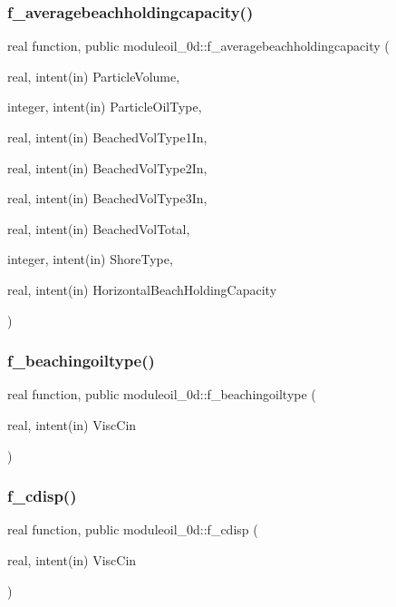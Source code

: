 \subsubsection{\texorpdfstring{f\+\_\+averagebeachholdingcapacity()}{f\_averagebeachholdingcapacity()}}
{\footnotesize\ttfamily real function, public moduleoil\+\_\+0d\+::f\+\_\+averagebeachholdingcapacity (\begin{DoxyParamCaption}\item[{real, intent(in)}]{Particle\+Volume,  }\item[{integer, intent(in)}]{Particle\+Oil\+Type,  }\item[{real, intent(in)}]{Beached\+Vol\+Type1\+In,  }\item[{real, intent(in)}]{Beached\+Vol\+Type2\+In,  }\item[{real, intent(in)}]{Beached\+Vol\+Type3\+In,  }\item[{real, intent(in)}]{Beached\+Vol\+Total,  }\item[{integer, intent(in)}]{Shore\+Type,  }\item[{real, intent(in)}]{Horizontal\+Beach\+Holding\+Capacity }\end{DoxyParamCaption})}

\mbox{\label{namespacemoduleoil__0d_a9937a8fb676e29f80bcbbda743712412}} 
\subsubsection{\texorpdfstring{f\+\_\+beachingoiltype()}{f\_beachingoiltype()}}
{\footnotesize\ttfamily real function, public moduleoil\+\_\+0d\+::f\+\_\+beachingoiltype (\begin{DoxyParamCaption}\item[{real, intent(in)}]{Visc\+Cin }\end{DoxyParamCaption})}

\mbox{\label{namespacemoduleoil__0d_aec999ef14a345781bcc8300cd1c2999f}} 
\subsubsection{\texorpdfstring{f\+\_\+cdisp()}{f\_cdisp()}}
{\footnotesize\ttfamily real function, public moduleoil\+\_\+0d\+::f\+\_\+cdisp (\begin{DoxyParamCaption}\item[{real, intent(in)}]{Visc\+Cin }\end{DoxyParamCaption})}

